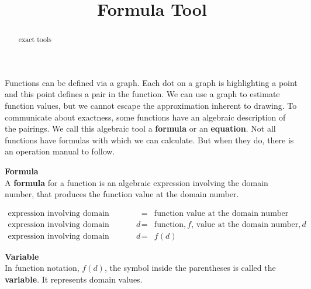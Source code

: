 \documentclass{ximera}
\title{Formula Tool}
\begin{document}
\begin{abstract}
exact tools
\end{abstract}
\maketitle



Functions can be defined via a graph. Each dot on a graph is highlighting a point and this point defines a pair in the function. We can use a graph to estimate function values, but we cannot escape the approximation inherent to drawing.  To communicate about exactness, some functions have an algebraic description of the pairings.  We call this algebraic tool a \textbf{formula} or an \textbf{equation}. Not all functions have formulas with which we can calculate.  But when they do, there is an operation manual to follow.



\begin{definition}  \textbf{\textcolor{green!50!black}{Formula}} \\ 

A \textbf{formula} for a function is an algebraic expression involving the domain number, that produces the function value at the domain number.
\end{definition}



\[
\begin{array}{rcl}
     \text{expression involving domain number} & = &  \text{function value at the domain number}  \\ 
      \text{expression involving domain number,} \, d  & = &  \text{function,} \, f \text{, value at the domain number,} \, d \\ 
      \text{expression involving domain number,} \, d & = & f(d) 
\end{array}
\]







\begin{definition}  \textbf{\textcolor{green!50!black}{Variable}} \\ 


In function notation, $f(d)$, the symbol inside the parentheses is called the \textbf{variable}. It represents domain values.
\end{definition}
\end{document}

